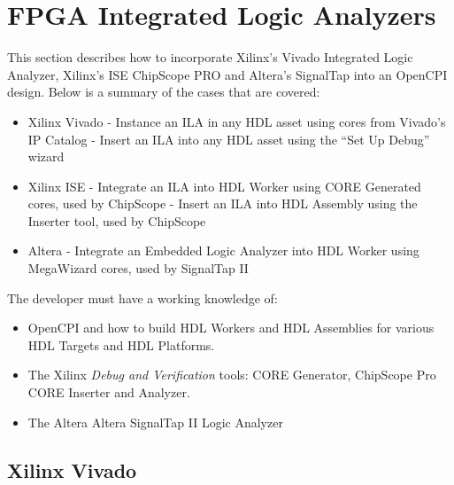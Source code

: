 \section{FPGA Integrated Logic Analyzers}

\begin{flushleft}

	This section describes how to incorporate Xilinx's Vivado Integrated Logic Analyzer, Xilinx's ISE ChipScope PRO and Altera's SignalTap into an OpenCPI design. Below is a summary of the cases that are covered:

	\begin{itemize}
		\item Xilinx Vivado
			\subitem - Instance an ILA in any HDL asset using cores from Vivado's IP Catalog
			\subitem - Insert an ILA into any HDL asset using the ``Set Up Debug'' wizard
	 	\item Xilinx ISE
	 		\subitem - Integrate an ILA into HDL Worker using CORE Generated cores, used by ChipScope
		 	\subitem - Insert an ILA into HDL Assembly using the Inserter tool, used by ChipScope
	 	\item Altera
	 		\subitem - Integrate an Embedded Logic Analyzer into HDL Worker using MegaWizard cores, used by SignalTap II
	\end{itemize}

	The developer must have a working knowledge of:
	\begin{itemize}
	 	\item OpenCPI and how to build HDL Workers and HDL Assemblies for various HDL Targets and HDL Platforms.
		\item The Xilinx \textit{Debug and Verification} tools: CORE Generator, ChipScope Pro CORE Inserter and Analyzer.
		\item The Altera Altera SignalTap II Logic Analyzer
	\end{itemize}

\newpage

\subsection{Xilinx Vivado}

\end{flushleft}
